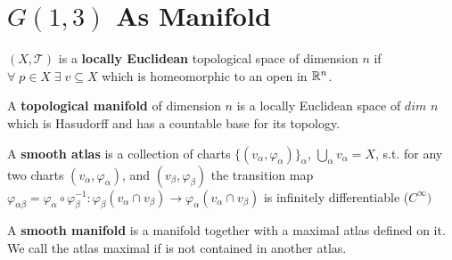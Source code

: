 \documentclass[11pt,a4paper]{report}
\begin{document}
\chapter{$G(1,3)$ As Manifold}
\begin{defn}
     $(X,\mathcal{T})$ is a \textbf{locally Euclidean} topological space of dimension $n$  if $\forall \; p \in X \; \exists \; v \subseteq X$ which is homeomorphic to an open in $\mathbb{R}^n$.
\end{defn}
\begin{defn}
      A \textbf{topological manifold} of dimension $n$ is a locally Euclidean space of $dim$ $n$ which is Hasudorff and has a countable base for its topology.
\end{defn}
\begin{defn}
      A \textbf{smooth atlas} is a collection of charts $\{ (v_{\alpha}, \varphi_{\alpha}) \}_{\alpha}$, $\bigcup_{\alpha} v_{\alpha} = X$, s.t. for any two charts $(v_{\alpha} , \varphi_{\alpha})$, and $(v_{\beta} , \varphi_{\beta})$
      the transition map $\varphi_{\alpha \beta} = \varphi_{\alpha} \circ \varphi_{\beta}^{-1} : \varphi_{\beta}(v_{\alpha} \cap v_{\beta}) \to \varphi_{\alpha}(v_{\alpha} \cap v_{\beta})$ is infinitely differentiable ($C^{\infty})$
\end{defn}
\begin{defn}
  A \textbf{smooth manifold} is a manifold together with a maximal atlas defined on it. We call the atlas maximal if is not contained in another atlas.
\end{defn}
\end{document}
